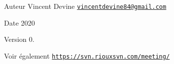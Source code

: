 \begin{DoxyAuthor}{Auteur}
Vincent Devine \href{mailto:vincentdevine84@gmail.com}{\tt vincentdevine84@gmail.\+com} 
\end{DoxyAuthor}
\begin{DoxyDate}{Date}
2020 
\end{DoxyDate}
\begin{DoxyVersion}{Version}
0. 
\end{DoxyVersion}
\begin{DoxySeeAlso}{Voir également}
\href{https://svn.riouxsvn.com/meeting/}{\tt https\+://svn.\+riouxsvn.\+com/meeting/} 
\end{DoxySeeAlso}
